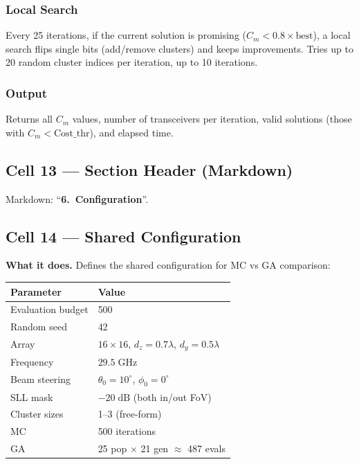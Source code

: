 \documentclass[11pt,a4paper]{article}
\begin{document}
\subsubsection{Local Search}
Every 25 iterations, if the current solution is promising ($C_m < 0.8 \times \text{best}$),
a local search flips single bits (add/remove clusters) and keeps improvements.
Tries up to 20 random cluster indices per iteration, up to 10 iterations.

\subsubsection{Output}
Returns all $C_m$ values, number of transceivers per iteration,
valid solutions (those with $C_m < \text{Cost\_thr}$), and elapsed time.

\subsection{Cell 13 --- Section Header (Markdown)}
Markdown: ``\textbf{6.\ Configuration}''.

\subsection{Cell 14 --- Shared Configuration}
\label{sec:cell14}

\textbf{What it does.}
Defines the shared configuration for MC vs GA comparison:

\begin{center}
\begin{tabular}{ll}
\toprule
\textbf{Parameter} & \textbf{Value} \\
\midrule
Evaluation budget & 500 \\
Random seed & 42 \\
Array & $16 \times 16$, $d_z = 0.7\lambda$, $d_y = 0.5\lambda$ \\
Frequency & $29.5\;\text{GHz}$ \\
Beam steering & $\theta_0 = 10^\circ$, $\phi_0 = 0^\circ$ \\
SLL mask & $-20\;\text{dB}$ (both in/out FoV) \\
Cluster sizes & 1--3 (free-form) \\
\midrule
MC & 500 iterations \\
GA & 25 pop $\times$ 21 gen $\approx$ 487 evals \\
\bottomrule
\end{tabular}
\end{center}
\end{document}
